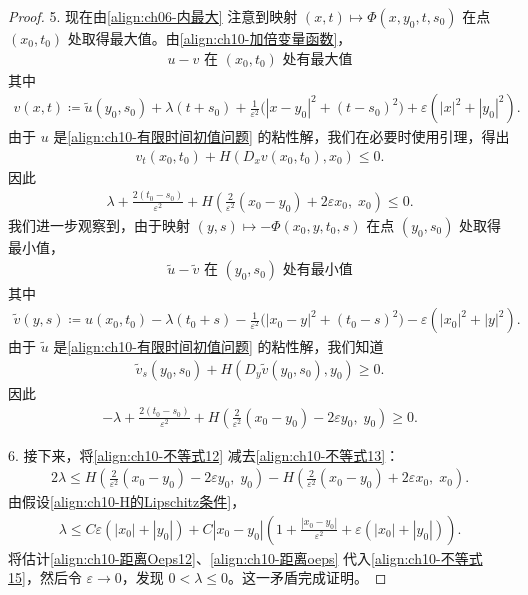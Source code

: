 \documentclass[../../main.tex]{subfiles}
\begin{document}
\begin{proof}
5. 现在由\eqref{align:ch06-内最大} 注意到映射 $(x,t)\mapsto\Phi(x,y_0,t,s_0)$ 在点 $(x_0,t_0)$ 处取得最大值。由\eqref{align:ch10-加倍变量函数}，
\begin{align*}
u-v \text{ 在 } (x_0,t_0) \text{ 处有最大值}
\end{align*}
其中
\begin{align*}
v(x,t)\coloneqq \widetilde{u}(y_0,s_0)+\lambda(t+s_0)+\frac{1}{\varepsilon^2}\big(|x-y_0|^2+(t-s_0)^2\big)+\varepsilon(|x|^2+|y_0|^2).
\end{align*}
由于 $u$ 是\eqref{align:ch10-有限时间初值问题} 的粘性解，我们在必要时使用引理，得出
\begin{align*}
v_t(x_0,t_0)+H(D_xv(x_0,t_0),x_0)\leqslant 0.
\end{align*}
因此
\begin{align}
\lambda+\frac{2(t_0-s_0)}{\varepsilon^2}+H\left(\frac{2}{\varepsilon^2}(x_0-y_0)+2\varepsilon x_0,\;x_0\right)\leqslant 0.
\label{align:ch10-不等式12}
\end{align}
我们进一步观察到，由于映射 $(y,s)\mapsto-\Phi(x_0,y,t_0,s)$ 在点 $(y_0,s_0)$ 处取得最小值，
\begin{align*}
\widetilde{u}-\widetilde{v} \text{ 在 } (y_0,s_0) \text{ 处有最小值}
\end{align*}
其中
\begin{align*}
\widetilde{v}(y,s)\coloneqq u(x_0,t_0)-\lambda(t_0+s)-\frac{1}{\varepsilon^2}\big(|x_0-y|^2+(t_0-s)^2\big)-\varepsilon(|x_0|^2+|y|^2).
\end{align*}
由于 $\widetilde{u}$ 是\eqref{align:ch10-有限时间初值问题} 的粘性解，我们知道
\begin{align*}
\widetilde{v}_s(y_0,s_0)+H(D_y\widetilde{v}(y_0,s_0),y_0)\geqslant 0.
\end{align*}
因此
\begin{align}
-\lambda+\frac{2(t_0-s_0)}{\varepsilon^2}+H\left(\frac{2}{\varepsilon^2}(x_0-y_0)-2\varepsilon y_0,\;y_0\right)\geqslant 0.
\label{align:ch10-不等式13}
\end{align}

6. 接下来，将\eqref{align:ch10-不等式12} 减去\eqref{align:ch10-不等式13}：
\begin{align}
2\lambda \leqslant H\left(\frac{2}{\varepsilon^2}(x_0-y_0)-2\varepsilon y_0,\;y_0\right)-H\left(\frac{2}{\varepsilon^2}(x_0-y_0)+2\varepsilon x_0,\;x_0\right).
\label{align:ch10-不等式14}
\end{align}
由假设\eqref{align:ch10-H的Lipschitz条件}，
\begin{align}
\lambda\leqslant C\varepsilon(|x_0|+|y_0|)+C|x_0-y_0|\left(1+\frac{|x_0-y_0|}{\varepsilon^2}+\varepsilon(|x_0|+|y_0|)\right).
\label{align:ch10-不等式15}
\end{align}
将估计\eqref{align:ch10-距离Oeps12}、\eqref{align:ch10-距离oeps} 代入\eqref{align:ch10-不等式15}，然后令 $\varepsilon\to 0$，发现 $0<\lambda\leqslant 0$。这一矛盾完成证明。
\end{proof}
\end{document}
